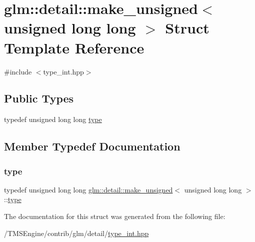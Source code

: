 \hypertarget{structglm_1_1detail_1_1make__unsigned_3_01unsigned_01long_01long_01_4}{}\section{glm\+:\+:detail\+:\+:make\+\_\+unsigned$<$ unsigned long long $>$ Struct Template Reference}
\label{structglm_1_1detail_1_1make__unsigned_3_01unsigned_01long_01long_01_4}


{\ttfamily \#include $<$type\+\_\+int.\+hpp$>$}

\subsection*{Public Types}
\begin{DoxyCompactItemize}
\item 
typedef unsigned long long \hyperlink{structglm_1_1detail_1_1make__unsigned_3_01unsigned_01long_01long_01_4_a3f3f1eb1cbdd286e6cb4afb5fa71d5c7}{type}
\end{DoxyCompactItemize}


\subsection{Member Typedef Documentation}
\mbox{\label{structglm_1_1detail_1_1make__unsigned_3_01unsigned_01long_01long_01_4_a3f3f1eb1cbdd286e6cb4afb5fa71d5c7}} 
\subsubsection{\texorpdfstring{type}{type}}
{\footnotesize\ttfamily typedef unsigned long long \hyperlink{structglm_1_1detail_1_1make__unsigned}{glm\+::detail\+::make\+\_\+unsigned}$<$ unsigned long long $>$\+::\hyperlink{structglm_1_1detail_1_1make__unsigned_3_01unsigned_01long_01long_01_4_a3f3f1eb1cbdd286e6cb4afb5fa71d5c7}{type}}



The documentation for this struct was generated from the following file\+:\begin{DoxyCompactItemize}
\item 
/\+T\+M\+S\+Engine/contrib/glm/detail/\hyperlink{type__int_8hpp}{type\+\_\+int.\+hpp}\end{DoxyCompactItemize}
